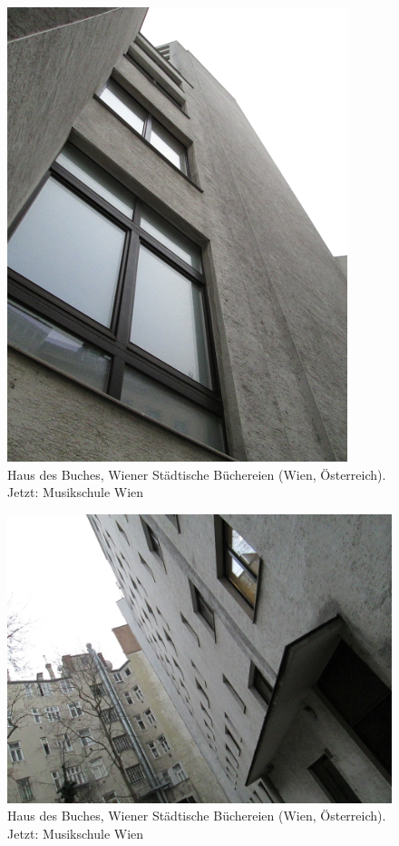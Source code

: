 \documentclass[a4paper,
fontsize=11pt,
oneside,
numbers=noperiodatend,
parskip=half-,
bibliography=totoc,
final
]{scrartcl}
\begin{document}
\begin{figure}[htbp]
\centering
\includegraphics{./img/030.jpg}
\caption{Haus des Buches, Wiener Städtische Büchereien (Wien,
Österreich). Jetzt: Musikschule
Wien}
\end{figure}

\begin{figure}[htbp]
\centering
\includegraphics{./img/031.jpg}
\caption{Haus des Buches, Wiener Städtische Büchereien (Wien,
Österreich). Jetzt: Musikschule
Wien}
\end{figure}
\end{document}
